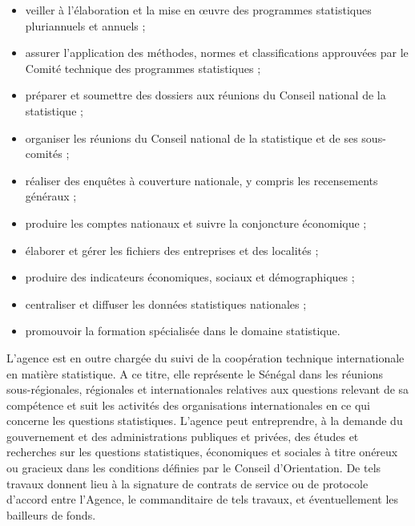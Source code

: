 \documentclass[12pt,a4paper,oneside]{report}
\begin{document}
\begin{itemize}

\item veiller à l’élaboration et la mise en œuvre des programmes statistiques pluriannuels et annuels ;

\item assurer l’application des méthodes, normes et classifications approuvées par le Comité technique des
programmes statistiques ;

\item préparer et soumettre des dossiers aux réunions du Conseil national de la statistique ;

\item organiser les réunions du Conseil national de la statistique et de ses sous-comités ;

\item réaliser des enquêtes à couverture nationale, y compris les recensements généraux ;

\item produire les comptes nationaux et suivre la conjoncture économique ;

\item élaborer et gérer les fichiers des entreprises et des localités ;

\item produire des indicateurs économiques, sociaux et démographiques ;

\item centraliser et diffuser les données statistiques nationales ;

\item promouvoir la formation spécialisée dans le domaine statistique.

\end{itemize}

L’agence est en outre chargée du suivi de la coopération technique internationale en matière statistique. A ce
titre, elle représente le Sénégal dans les réunions sous-régionales, régionales et internationales relatives
aux questions relevant de sa compétence et suit les activités des organisations internationales en ce qui
concerne les questions statistiques. L’agence peut entreprendre, à la demande du gouvernement et des
administrations publiques et privées, des études et recherches sur les questions statistiques, économiques et
sociales à titre onéreux ou gracieux dans les conditions définies par le Conseil d’Orientation. De tels
travaux donnent lieu à la signature de contrats de service ou de protocole d’accord entre l’Agence, le
commanditaire de tels travaux, et éventuellement les bailleurs de fonds.
\end{document}
